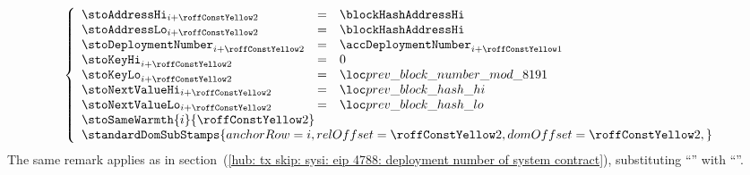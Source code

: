 \item[\underline{\underline{Storing the \inst{BLOCKHASH} in the state:}}] 
	\[
		\left\{ \begin{array}{lclr}
			\stoAddressHi         _{i + \roffTxSkipSysiBlockHashSystemContractStorage} & = & \blockHashAddressHi                                                      \\
			\stoAddressLo         _{i + \roffTxSkipSysiBlockHashSystemContractStorage} & = & \blockHashAddressHi                                                      \\
			\stoDeploymentNumber  _{i + \roffTxSkipSysiBlockHashSystemContractStorage} & = & \accDeploymentNumber _{i + \roffTxSkipSysiBlockHashSystemContractAccount} \\
			\stoKeyHi             _{i + \roffTxSkipSysiBlockHashSystemContractStorage} & = & 0                                                                         \\
			\stoKeyLo             _{i + \roffTxSkipSysiBlockHashSystemContractStorage} & = & \locPreviousBlockNumberModuloPrime                                          \\
			\stoNextValueHi       _{i + \roffTxSkipSysiBlockHashSystemContractStorage} & = & \locPreviousBlockHashHi                                                   \\
			\stoNextValueLo       _{i + \roffTxSkipSysiBlockHashSystemContractStorage} & = & \locPreviousBlockHashLo                                                   \\
			\multicolumn{3}{l}{\stoSameWarmth  {i}{\roffTxSkipSysiBlockHashSystemContractStorage} } \\
			\multicolumn{3}{l}{
				\standardDomSubStamps {
					anchorRow = i                                             ,
					relOffset = \roffTxSkipSysiBlockHashSystemContractStorage ,
					domOffset = \roffTxSkipSysiBlockHashSystemContractStorage ,
				}} \\
		\end{array} \right.
	\]
	\saNote{} \label{hub: tx skip: sysi: eip 2935: deployment number of system contract}
	The same remark applies as in
	section~(\ref{hub: tx skip: sysi: eip 4788: deployment number of system contract}),
	substituting
	``\beaconRootAddress''
	with
	``\blockHashAddress''.
